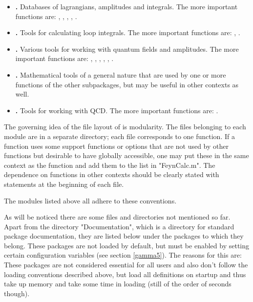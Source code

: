 \begin{itemize}

\item{{\bf \fctables.} Databases of lagrangians, amplitudes and integrals. The more important functions are: , , , , .}

\item{{\bf \fcloops.} Tools for calculating loop integrals. The more important functions are: , .}

\item{{\bf \fctools.} Various tools for working with quantum fields and amplitudes. The more important functions are: , , , , , .}

\item{{\bf \general.} Mathematical tools of a general nature that are used by one or more functions of the other subpackages, but may be useful in other contexts as well.}

\item{{\bf \qcd.} Tools for working with QCD. The more important functions are: .}

\end{itemize}

The governing idea of the file layout of \fc is modularity. The files belonging to each module are in a separate directory; each file corresponds to one function. If a function uses some support functions or options that are not used by other functions but desirable to have globally accessible, one may put these in the same context as the function and add them to the list  in "FeynCalc.m". The dependence on functions in other contexts should be clearly stated with  statements at the beginning of each file.

The modules listed above all adhere to these conventions.

As will be noticed there are some files and directories not mentioned so far. Apart from the directory "Documentation", which is a directory for standard \mma package documentation, they are listed below under the packages to which they belong. These packages are not loaded by default, but must be enabled by setting certain configuration variables (see section \ref{gamma5}). The reasons for this are: These packages are not considered essential for all users and also don't follow the loading conventions described above, but load all definitions on startup and thus take up memory and take some time in loading (still of the order of seconds though).

